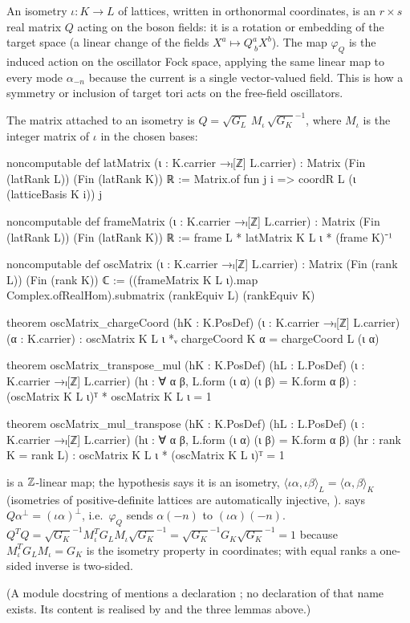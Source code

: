 \begin{physics}
An isometry $\iota\colon K\to L$ of lattices, written in orthonormal coordinates, is an $r\times s$ real matrix $Q$ acting on the boson fields: it is a rotation or embedding of the target space (a linear change of the fields $X^a\mapsto Q^a_{\ b}X^b$). The map $\varphi_Q$ is the induced action on the oscillator Fock space, applying the same linear map to every mode $\alpha_{-n}$ because the current is a single vector-valued field. This is how a symmetry or inclusion of target tori acts on the free-field oscillators.
\end{physics}

The matrix attached to an isometry is $Q=\sqrt{G_L}\,M_\iota\,\sqrt{G_K}^{-1}$, where $M_\iota$ is
the integer matrix of $\iota$ in the chosen bases:
\begin{leancode}
noncomputable def latMatrix (ι : K.carrier →ₗ[ℤ] L.carrier) :
    Matrix (Fin (latRank L)) (Fin (latRank K)) ℝ :=
  Matrix.of fun j i => coordR L (ι (latticeBasis K i)) j

noncomputable def frameMatrix (ι : K.carrier →ₗ[ℤ] L.carrier) :
    Matrix (Fin (latRank L)) (Fin (latRank K)) ℝ :=
  frame L * latMatrix K L ι * (frame K)⁻¹

noncomputable def oscMatrix (ι : K.carrier →ₗ[ℤ] L.carrier) :
    Matrix (Fin (rank L)) (Fin (rank K)) ℂ :=
  ((frameMatrix K L ι).map Complex.ofRealHom).submatrix (rankEquiv L) (rankEquiv K)

theorem oscMatrix_chargeCoord (hK : K.PosDef) (ι : K.carrier →ₗ[ℤ] L.carrier) (α : K.carrier) :
    oscMatrix K L ι *ᵥ chargeCoord K α = chargeCoord L (ι α)

theorem oscMatrix_transpose_mul (hK : K.PosDef) (hL : L.PosDef)
    (ι : K.carrier →ₗ[ℤ] L.carrier) (hι : ∀ α β, L.form (ι α) (ι β) = K.form α β) :
    (oscMatrix K L ι)ᵀ * oscMatrix K L ι = 1

theorem oscMatrix_mul_transpose (hK : K.PosDef) (hL : L.PosDef)
    (ι : K.carrier →ₗ[ℤ] L.carrier) (hι : ∀ α β, L.form (ι α) (ι β) = K.form α β)
    (hr : rank K = rank L) :
    oscMatrix K L ι * (oscMatrix K L ι)ᵀ = 1
\end{leancode}
\begin{dictionary}
 is a ${\mathbb{Z}}$-linear map; the hypothesis  says it is an
isometry, $\langle\iota\alpha,\iota\beta\rangle_L=\langle\alpha,\beta\rangle_K$ (isometries of
positive-definite lattices are automatically injective, ).
 says $Q\alpha^\perp=(\iota\alpha)^\perp$, i.e.\ $\varphi_Q$ sends
$\alpha(-n)$ to $(\iota\alpha)(-n)$. $Q^TQ=\sqrt{G_K}^{-1}M_\iota^TG_LM_\iota\sqrt{G_K}^{-1}=
\sqrt{G_K}^{-1}G_K\sqrt{G_K}^{-1}=1$ because $M_\iota^TG_LM_\iota=G_K$ is the isometry property in
coordinates; with equal ranks a one-sided inverse is two-sided.
\end{dictionary}
(A module docstring of  mentions a declaration
; no declaration of that name exists. Its content is realised by
 and the three lemmas above.)

